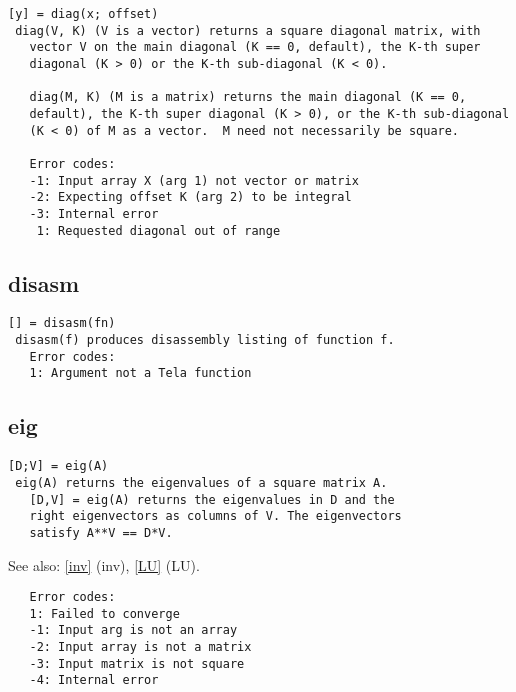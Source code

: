 \documentclass[a4paper]{article}
\begin{document}
\begin{tscreen}
\begin{verbatim}
[y] = diag(x; offset)
 diag(V, K) (V is a vector) returns a square diagonal matrix, with
   vector V on the main diagonal (K == 0, default), the K-th super
   diagonal (K > 0) or the K-th sub-diagonal (K < 0).

   diag(M, K) (M is a matrix) returns the main diagonal (K == 0,
   default), the K-th super diagonal (K > 0), or the K-th sub-diagonal
   (K < 0) of M as a vector.  M need not necessarily be square.

   Error codes:
   -1: Input array X (arg 1) not vector or matrix
   -2: Expecting offset K (arg 2) to be integral
   -3: Internal error
    1: Requested diagonal out of range
\end{verbatim}
\end{tscreen}





\subsection{disasm\label{disasm}}

\begin{tscreen}
\begin{verbatim}
[] = disasm(fn)
 disasm(f) produces disassembly listing of function f.
   Error codes:
   1: Argument not a Tela function 
\end{verbatim}
\end{tscreen}





\subsection{eig\label{eig}}

\begin{tscreen}
\begin{verbatim}
[D;V] = eig(A)
 eig(A) returns the eigenvalues of a square matrix A.
   [D,V] = eig(A) returns the eigenvalues in D and the
   right eigenvectors as columns of V. The eigenvectors
   satisfy A**V == D*V.
\end{verbatim}

See also: \ref{inv} {(inv)}, \ref{LU} {(LU)}.
\begin{verbatim}
   Error codes:
   1: Failed to converge
   -1: Input arg is not an array
   -2: Input array is not a matrix
   -3: Input matrix is not square
   -4: Internal error
   
\end{verbatim}
\end{tscreen}
\end{document}
